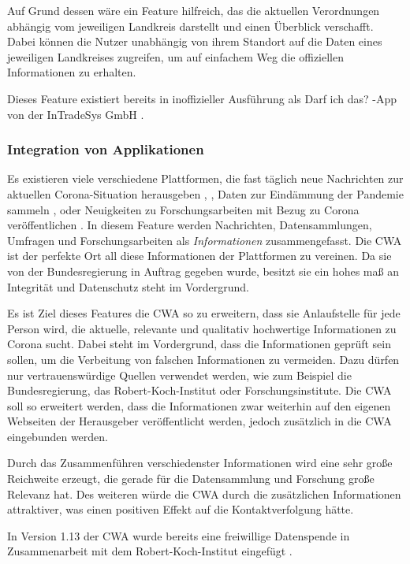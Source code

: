 \documentclass[conference,compsoc]{IEEEtran}
\begin{document}
Auf Grund dessen wäre ein Feature hilfreich, das die aktuellen Verordnungen abhängig vom jeweiligen Landkreis darstellt und einen Überblick verschafft.
Dabei können die Nutzer unabhängig von ihrem Standort auf die Daten eines jeweiligen Landkreises zugreifen,
um auf einfachem Weg die offiziellen Informationen zu erhalten. 

Dieses Feature existiert bereits in inoffizieller Ausführung als \glqq Darf ich das?\grqq{} -App von der InTradeSys GmbH \cite{DarfIchDas}.\\

\subsubsection{Integration von Applikationen}
Es existieren viele verschiedene Plattformen, die fast täglich neue Nachrichten zur aktuellen Corona-Situation herausgeben \cite{RKI}, \cite{BMG}, Daten zur Eindämmung der Pandemie sammeln \cite{RKIDatenspende}, \cite{Gedaechtnistest} oder Neuigkeiten zu Forschungsarbeiten mit Bezug zu Corona veröffentlichen \cite{GesundheitsforschungNews}.
In diesem Feature werden Nachrichten, Datensammlungen, Umfragen und Forschungsarbeiten als \textit{Informationen} zusammengefasst.
Die CWA ist der perfekte Ort all diese Informationen der Plattformen zu vereinen. 
Da sie von der Bundesregierung in Auftrag gegeben wurde, besitzt sie ein hohes maß an Integrität und Datenschutz steht im Vordergrund.

Es ist Ziel dieses Features die CWA so zu erweitern, dass sie Anlaufstelle für jede Person wird, die aktuelle, relevante und qualitativ hochwertige Informationen zu Corona sucht.
Dabei steht im Vordergrund, dass die Informationen geprüft sein sollen, um die Verbeitung von falschen Informationen zu vermeiden. 
Dazu dürfen nur vertrauenswürdige Quellen verwendet werden, wie zum Beispiel die Bundesregierung, das Robert-Koch-Institut oder Forschungsinstitute. 
Die CWA soll so erweitert werden, dass die Informationen zwar weiterhin auf den eigenen Webseiten der Herausgeber veröffentlicht werden, jedoch zusätzlich in die CWA eingebunden werden.

Durch das Zusammenführen verschiedenster Informationen wird eine sehr große Reichweite erzeugt, die gerade für die Datensammlung und Forschung große Relevanz hat.
Des weiteren würde die CWA durch die zusätzlichen Informationen attraktiver, was einen positiven Effekt auf die Kontaktverfolgung hätte.

In Version 1.13 der CWA wurde bereits eine freiwillige Datenspende in Zusammenarbeit mit dem Robert-Koch-Institut eingefügt \cite{freiwilligeDatenspende}. 
\end{document}
